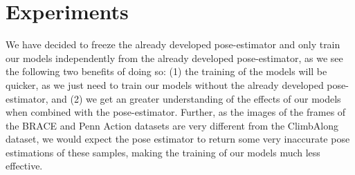 \documentclass[./main.tex]{subfiles}
\begin{document}
\section{Experiments}
\label{sec:experiments}

We have decided to freeze the already developed pose-estimator and only train our models independently from the already developed pose-estimator, as we see the following two benefits of doing so: (1) the training of the models will be quicker, as we just need to train our models without the already developed pose-estimator, and (2) we get an greater understanding of the effects of our models when combined with the pose-estimator. Further, as the images of the frames of the BRACE and Penn Action datasets are very different from the ClimbAlong dataset, we would expect the pose estimator to return some very inaccurate pose estimations of these samples, making the training of our models much less effective.
\end{document}
